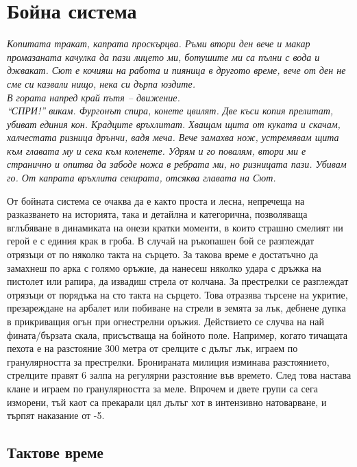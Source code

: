 \section{Бойна система}
\emph{Копитата тракат, капрата проскърцва.
Ръми втори ден вече и макар промазаната качулка да пази лицето ми, ботушите ми са пълни с вода и джвакат.
Сют е кочияш на работа и пияница в другото време, вече от ден не сме си казвали нищо, нека си дърпа юздите.
\\
В гората напред край пътя – движение.
\\
“СПРИ!” викам.
Фургонът спира, конете цвилят.
Две къси копия прелитат, убиват единия кон.
Крадците връхлитат.
Хващам щита от куката и скачам, халчестата ризница дрънчи, вадя меча.
Вече замахва нож, устремявам щита към главата му и сека към коленете.
Удрям и го повалям, втори ми е странично и опитва да забоде ножа в ребрата ми, но ризницата пази.
Убивам го. От капрата връхлита секирата, отсяква главата на Сют.}

\vspace{5mm} \indent
От бойната система се очаква да е както проста и лесна, непречеща на разказването на историята, така и детайлна и категорична, позволяваща вглъбяване в динамиката на онези кратки моменти, в които страшно смелият ни герой е с единия крак в гроба.
В случай на ръкопашен бой се разглеждат отрязъци от по няколко такта на сърцето.
За такова време е достатъчно да замахнеш по арка с голямо оръжие, да нанесеш няколко удара с дръжка на пистолет или рапира, да извадиш стрела от колчана.
За престрелки се разглеждат отрязъци от порядъка на сто такта на сърцето.
Това отразява търсене на укритие, презареждане на арбалет или побиване на стрели в земята за лък, дебнене дупка в прикриващия огън при огнестрелни оръжия.
Действието се случва на най фината/бързата скала, присъстваща на бойното поле.
Например, когато тичащата пехота е на разстояние 300 метра от срелците с дълъг лък, играем по гранулярността за престрелки.
Бронираната милиция изминава разстоянието, стрелците правят 6 залпа на регулярни разстояние във времето.
След това настава клане и играем по гранулярността за меле.
Впрочем и двете групи са сега изморени, тъй каот са прекарали цял дълъг хот в интензивно натоварване, и търпят наказание от -5.

\subsection{Тактове време}
